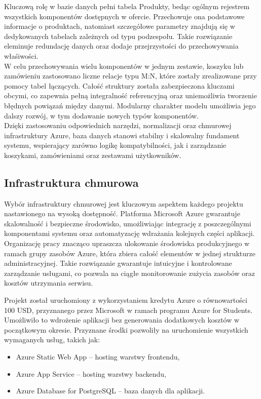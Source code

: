 \documentclass[a4paper,twoside,12pt]{book}
\begin{document}
Kluczową rolę w bazie danych pełni tabela Produkty, bedąc ogólnym rejestrem wszystkich komponentów dostępnych w ofercie. Przechowuje ona podstawowe informacje o produktach, natomiast szczegółowe parametry znajdują się w dedykowanych tabelach zależnych od typu podzespołu. Takie rozwiązanie eleminuje redundację danych oraz dodaje przejrzystości do przechowywania właśiwości.
\vspace{0.5cm}
\\
W celu przechowywania wielu komponentów w jednym zestawie, koszyku lub zamówieniu zastosowano liczne relacje typu M:N, które zostały zrealizowane przy pomocy tabel łączących. Całość struktury została zabezpieczona kluczami obcymi, co zapewnia pełną integralność referencyjną oraz uniemożliwia tworzenie błędnych powiązań między danymi. Modularny charakter modelu umożliwia jego dalszy rozwój, w tym dodawanie nowych typów komponentów.
\vspace{0.5cm}
\\
Dzięki zastosowaniu odpowiednich narzędzi, normalizacji oraz chmurowej infrastruktury Azure, baza danych stanowi stabilny i skalowalny fundament systemu, wspierający zarówno logikę kompatybilności, jak i zarządzanie koszykami, zamówieniami oraz zestawami użytkowników.
\newpage
\subsection{Infrastruktura chmurowa}
Wybór infrastruktury chmurowej jest kluczowym aspektem każdego projektu nastawionego na wysoką dostępność. Platforma Microsoft Azure gwarantuje skalowalność i bezpieczne środowisko, umożliwiając integrację z poszczególnymi komponentami systemu oraz automatyzację wdrażania kolejnych części aplikacji. Organizację pracy znacząco upraszcza ulokowanie środowiska produkcyjnego w ramach grupy zasobów Azure, która zbiera całość elementów w jednej strukturze administracyjnej. Takie rozwiązanie gwarantuje intuicyjne i kontrolowane zarządzanie usługami, co pozwala na ciągłe monitorowanie zużycia zasobów oraz kosztów utrzymania serwisu.

Projekt został uruchomiony z wykorzystaniem kredytu Azure o równowartości 100 USD, przyznanego przez Microsoft w ramach programu Azure for Students. Umożliwiło to wdrożenie aplikacji bez generowania dodatkowych kosztów w początkowym okresie. Przyznane środki pozwoliły na uruchomienie wszystkich wymaganych usług, takich jak:
\begin{itemize}
    \item Azure Static Web App – hosting warstwy frontendu,
    \item Azure App Service – hosting warstwy backendu,
    \item Azure Database for PostgreSQL – baza danych dla aplikacji.

\end{itemize}
\end{document}
